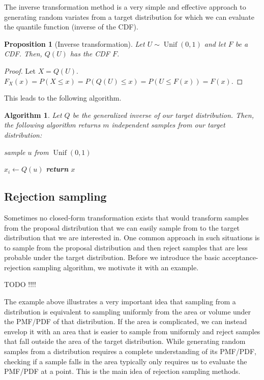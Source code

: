 \documentclass{book}
\theoremstyle{plain}%
\newtheorem{prototheorem}{Example}[section]
\newenvironment{cexample}
   {\colorlet{shadecolor}{gray!10}\begin{shaded}\begin{prototheorem}}
   {\end{prototheorem}\end{shaded}}
\newtheorem{proposition}{Proposition}[section]
\newtheorem{algo}{Algorithm}[section]
\theoremstyle{definition}
\DeclareMathOperator{\Unif}{Unif}
\begin{document}
The inverse transformation method is a very simple and effective approach to generating random variates from a target distribution for which we can evaluate the quantile function (inverse of the CDF).

\begin{proposition}[Inverse transformation]
Let $U \sim \Unif(0,1)$ and let $F$ be a CDF. Then, $Q(U)$ has the CDF $F$.
\end{proposition}

\begin{proof}
Let $X = Q(U)$. $F_X(x) = P(X \leq x) = P(Q(U) \leq x) = P(U \leq F(x)) = F(x)$.
\end{proof}

This leads to the following algorithm.

\begin{algo}
Let $Q$ be the generalized inverse of our target distribution. Then, the following algorithm returns $m$ independent samples from our target distribution:
\begin{algorithmic}[1]
     
\State sample $u$ from $\Unif(0,1)$

                \State $x_i \gets Q(u)$
              \EndFor
              \State \textbf{return} $x$
        \EndProcedure
    \end{algorithmic}
\end{algo}


\subsection*{Rejection sampling}

Sometimes no closed-form transformation exists that would transform samples from the proposal distribution that we can easily sample from to the target distribution that we are interested in. One common approach in such situations is to sample from the proposal distribution and then reject samples that are less probable under the target distribution. Before we introduce the basic acceptance-rejection sampling algorithm, we motivate it with an example.

TODO !!!!

The example above illustrates a very important idea that sampling from a distribution is equivalent to sampling uniformly from the area or volume under the PMF/PDF of that distribution. If the area is complicated, we can instead envelop it with an area that is easier to sample from uniformly and reject samples that fall outside the area of the target distribution. While generating random samples from a distribution requires a complete understanding of its PMF/PDF, checking if a sample falls in the area typically only requires us to evaluate the PMF/PDF at a point. This is the main idea of rejection sampling methods.
\end{document}
